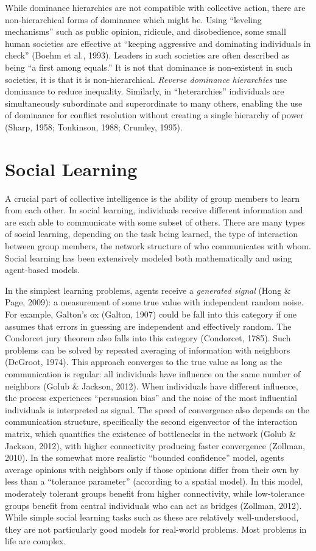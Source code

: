 While dominance hierarchies are not compatible with collective action, there are non-hierarchical forms of dominance which might be. Using ``leveling mechanisms'' such as public opinion, ridicule, and disobedience, some small human societies are effective at ``keeping aggressive and dominating individuals in check'' (Boehm et al., 1993). Leaders in such societies are often described as being ``a first among equals.'' It is not that dominance is non-existent in such societies, it is that it is non-hierarchical. {\em Reverse dominance hierarchies} use dominance to reduce inequality. Similarly, in ``heterarchies'' individuals are simultaneously subordinate and superordinate to many others, enabling the use of dominance for conflict resolution without creating a single hierarchy of power (Sharp, 1958; Tonkinson, 1988; Crumley, 1995).

\section{Social Learning}\label{sec:social-learning}
A crucial part of collective intelligence is the ability of group members to learn from each other. In social learning, individuals receive different information and are each able to communicate with some subset of others. There are many types of social learning, depending on the task being learned, the type of interaction between group members, the network structure of who communicates with whom. Social learning has been extensively modeled both mathematically and using agent-based models.

In the simplest learning problems, agents receive a {\em generated signal} (Hong \& Page, 2009): a measurement of some true value with independent random noise. For example, Galton's ox (Galton, 1907) could be fall into this category if one assumes that errors in guessing are independent and effectively random. The Condorcet jury theorem also falls into this category (Condorcet, 1785). Such problems can be solved by repeated averaging of information with neighbors (DeGroot, 1974). This approach converges to the true value as long as the communication is regular: all individuals have influence on the same number of neighbors (Golub \& Jackson, 2012). When individuals have different influence, the process experiences ``persuasion bias'' and the noise of the most influential individuals is interpreted as signal. The speed of convergence also depends on the communication structure, specifically the second eigenvector of the interaction matrix, which quantifies the existence of bottlenecks in the network (Golub \& Jackson, 2012), with higher connectivity producing faster convergence (Zollman, 2010). In the somewhat more realistic ``bounded confidence'' model, agents average opinions with neighbors only if those opinions differ from their own by less than a ``tolerance parameter'' (according to a spatial model). In this model, moderately tolerant groups benefit from higher connectivity, while low-tolerance groups benefit from central individuals who can act as bridges (Zollman, 2012). While simple social learning tasks such as these are relatively well-understood, they are not particularly good models for real-world problems. Most problems in life are complex.

